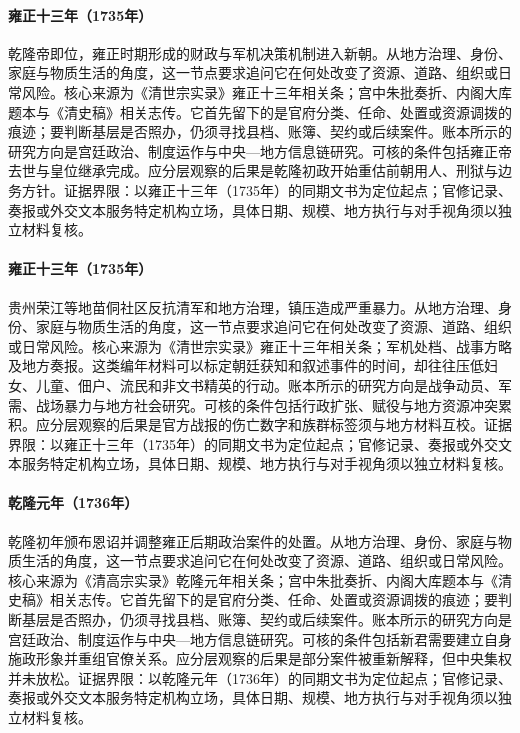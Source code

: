 \hypertarget{social:EQ-1735-QIANLONG-ACCESSION}{}\paragraph{雍正十三年（1735年）}乾隆帝即位，雍正时期形成的财政与军机决策机制进入新朝。从地方治理、身份、家庭与物质生活的角度，这一节点要求追问它在何处改变了资源、道路、组织或日常风险。核心来源为《清世宗实录》雍正十三年相关条；宫中朱批奏折、内阁大库题本与《清史稿》相关志传。它首先留下的是官府分类、任命、处置或资源调拨的痕迹；要判断基层是否照办，仍须寻找县档、账簿、契约或后续案件。账本所示的研究方向是宫廷政治、制度运作与中央—地方信息链研究。可核的条件包括雍正帝去世与皇位继承完成。应分层观察的后果是乾隆初政开始重估前朝用人、刑狱与边务方针。证据界限：以雍正十三年（1735年）的同期文书为定位起点；官修记录、奏报或外交文本服务特定机构立场，具体日期、规模、地方执行与对手视角须以独立材料复核。
\hypertarget{social:EQ-1735-MIAO-UPRISING-RONGJIANG}{}\paragraph{雍正十三年（1735年）}贵州荣江等地苗侗社区反抗清军和地方治理，镇压造成严重暴力。从地方治理、身份、家庭与物质生活的角度，这一节点要求追问它在何处改变了资源、道路、组织或日常风险。核心来源为《清世宗实录》雍正十三年相关条；军机处档、战事方略及地方奏报。这类编年材料可以标定朝廷获知和叙述事件的时间，却往往压低妇女、儿童、佃户、流民和非文书精英的行动。账本所示的研究方向是战争动员、军需、战场暴力与地方社会研究。可核的条件包括行政扩张、赋役与地方资源冲突累积。应分层观察的后果是官方战报的伤亡数字和族群标签须与地方材料互校。证据界限：以雍正十三年（1735年）的同期文书为定位起点；官修记录、奏报或外交文本服务特定机构立场，具体日期、规模、地方执行与对手视角须以独立材料复核。
\hypertarget{social:EQ-1736-AMNESTY-AND-RECTIFICATION}{}\paragraph{乾隆元年（1736年）}乾隆初年颁布恩诏并调整雍正后期政治案件的处置。从地方治理、身份、家庭与物质生活的角度，这一节点要求追问它在何处改变了资源、道路、组织或日常风险。核心来源为《清高宗实录》乾隆元年相关条；宫中朱批奏折、内阁大库题本与《清史稿》相关志传。它首先留下的是官府分类、任命、处置或资源调拨的痕迹；要判断基层是否照办，仍须寻找县档、账簿、契约或后续案件。账本所示的研究方向是宫廷政治、制度运作与中央—地方信息链研究。可核的条件包括新君需要建立自身施政形象并重组官僚关系。应分层观察的后果是部分案件被重新解释，但中央集权并未放松。证据界限：以乾隆元年（1736年）的同期文书为定位起点；官修记录、奏报或外交文本服务特定机构立场，具体日期、规模、地方执行与对手视角须以独立材料复核。
